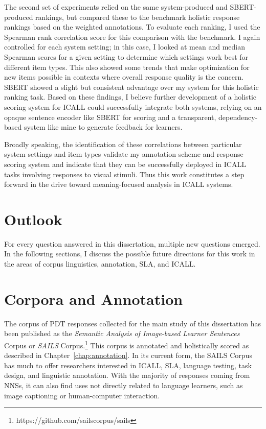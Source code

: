 The second set of experiments relied on the same system-produced and SBERT-produced rankings, but compared these to the benchmark holistic response rankings based on the weighted annotations. To evaluate each ranking, I used the Spearman rank correlation score for this comparison with the benchmark. I again controlled for each system setting; in this case, I looked at mean and median Spearman scores for a given setting to determine which settings work best for different item types. This also showed some trends that make optimization for new items possible in contexts where overall response quality is the concern. SBERT showed a slight but consistent advantage over my system for this holistic ranking task. Based on these findings, I believe further development of a holistic scoring system for ICALL could successfully integrate both systems, relying on an opaque sentence encoder like SBERT for scoring and a transparent, dependency-based system like mine to generate feedback for learners.

Broadly speaking, the identification of these correlations between particular system settings and item types validate my annotation scheme and response scoring system and indicate that they can be successfully deployed in ICALL tasks involving responses to visual stimuli. Thus this work constitutes a step forward in the drive toward meaning-focused analysis in ICALL systems.


\section{Outlook}
\label{sec:conclusion-outlook}

For every question answered in this dissertation, multiple new questions emerged. In the following sections, I discuss the possible future directions for this work in the areas of corpus linguistics, annotation, SLA, and ICALL.

\section{Corpora and Annotation}
\label{sec:outlook-annotation}
The corpus of PDT responses collected for the main study of this dissertation has been published as the \textit{Semantic Analysis of Image-based Learner Sentences} Corpus or \textit{SAILS} Corpus.\footnote{https://github.com/sailscorpus/sails} This corpus is annotated and holistically scored as described in Chapter~\ref{chap:annotation}. In its current form, the SAILS Corpus has much to offer researchers interested in ICALL, SLA, language testing, task design, and linguistic annotation. With the majority of responses coming from NNSs, it can also find uses not directly related to language learners, such as image captioning or human-computer interaction. 

